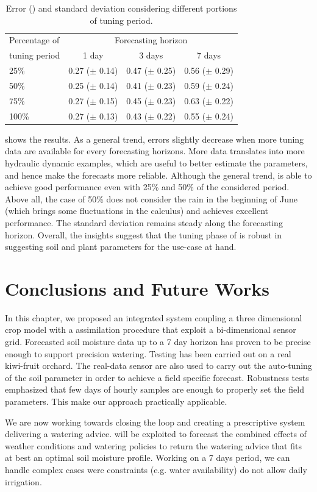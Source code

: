 \begin{table}[H]
\centering
\begin{tabular}{p{3cm}|ccc}
\toprule
Percentage of & \multicolumn{3}{c}{Forecasting horizon} \\
 tuning period & \multicolumn{1}{c|}{1 day} & \multicolumn{1}{c|}{3 days} & \multicolumn{1}{c}{7 days} \\ \midrule
25\%  & 0.27 ($\pm$ 0.14) & 0.47 ($\pm$ 0.25) & 0.56 ($\pm$ 0.29) \\
50\% & 0.25 ($\pm$ 0.14) & 0.41 ($\pm$ 0.23) & 0.59 ($\pm$ 0.24) \\
75\% & 0.27 ($\pm$ 0.15) & 0.45 ($\pm$ 0.23) & 0.63 ($\pm$ 0.22) \\
100\% & 0.27 ($\pm$ 0.13) & 0.43 ($\pm$ 0.22) & 0.55 ($\pm$ 0.24) \\ \bottomrule
\end{tabular}

\caption{Error () and standard deviation considering different portions of tuning period.}
\label{orchard-tbl:tuning_budget}
\end{table}

 shows the results. As a general trend, errors slightly decrease when more tuning data are available for every forecasting horizons. More data translates into more hydraulic dynamic examples, which are useful to better estimate the parameters, and hence make the forecasts more reliable.
Although the general trend, \olab{} is able to achieve good performance even with 25\% and 50\% of the considered period.
Above all, the case of 50\% does not consider the rain in the beginning of June (which brings some fluctuations in the calculus) and achieves excellent performance.
The standard deviation remains steady along the forecasting horizon.
Overall, the insights suggest that the tuning phase of \olab{} is robust in suggesting soil and plant parameters for the use-case at hand.


\section{Conclusions and Future Works}
In this chapter, we proposed an integrated system coupling a three dimensional crop model with a assimilation procedure that exploit a bi-dimensional sensor grid. Forecasted soil moisture data up to a 7 day horizon has proven to be precise enough to support precision watering. Testing has been carried out on a real kiwi-fruit orchard. The real-data sensor are also used to carry out the auto-tuning of the soil parameter in order to achieve a field specific forecast. Robustness tests emphasized that few days of hourly samples are enough to properly set the field parameters. This make our approach practically applicable. 

We are now working towards closing the loop and creating a prescriptive system delivering a watering advice. \olab{} will be exploited to forecast the combined effects of weather conditions and watering policies to return the watering advice that fits at best an optimal soil moisture profile.  Working on a 7 days period, we can handle complex cases were constraints (e.g. water availability) do not allow daily irrigation.
